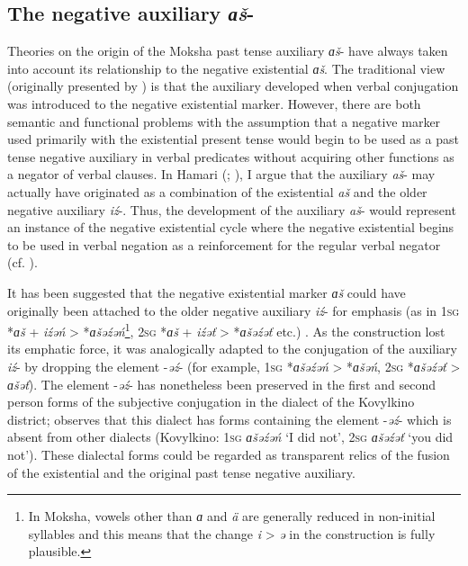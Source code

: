 \documentclass[output=paper]{langsci/langscibook}
\begin{document}
\subsection{The negative auxiliary \textit{ɑš}-}\label{sec:2:7.2}

Theories on the origin of the Moksha past tense auxiliary \textit{ɑš}- have always taken into account its relationship to the negative existential \textit{ɑš}. The traditional view (originally presented by \citealt[148]{Szinnyei1884}) is that the auxiliary developed when verbal conjugation was introduced to the negative existential marker. However, there are both semantic and functional problems with the assumption that a negative marker used primarily with the existential present tense would begin to be used as a past tense negative auxiliary in verbal predicates without acquiring other functions as a negator of verbal clauses. In Hamari (\citeyear[275]{Hamari2007}; \citeyear[480]{Hamari2013}), I argue that the auxiliary \textit{aš}- may actually have originated as a combination of the existential \textit{aš} and the older negative auxiliary \textit{iź}-. Thus, the development of the auxiliary \textit{aš}- would represent an instance of the negative existential cycle where the negative existential begins to be used in verbal negation as a reinforcement for the regular verbal negator (cf. \citealt[10--11]{Croft1991}).

It has been suggested that the negative existential marker \textit{ɑš}
could have originally been attached to the older negative auxiliary
\textit{iź}- for emphasis (as in \textsc{1sg} *\textit{ɑš} +
\textit{iźəń} > *\textit{ɑšəźəń}\footnote{In Moksha, vowels
other than \textit{ɑ} and \textit{ä} are generally reduced in non-initial
syllables and this means that the change \textit{i} > \textit{ə} in the
construction is fully plausible.}, \textsc{2sg} *\textit{ɑš} +
\textit{iźəť} > *\textit{ɑšəźəť} etc.) \parencites[273--275]{Hamari2007}[479--480]{Hamari2013}. As the construction lost its emphatic force, it was analogically adapted to the conjugation of the auxiliary \textit{iź}- by dropping the element -\textit{əź}- (for example, \textsc{1sg} *\textit{ɑšəźəń} > *\textit{ɑšəń}, \textsc{2sg} *\textit{ɑšəźəť} > \textit{ɑšəť}). The element -\textit{əź}- has nonetheless been preserved in the first and second person forms of the subjective conjugation in the dialect of the Kovylkino district; \citet[178]{Schemerova1972} observes that this dialect has forms containing the element -\textit{əź}- which is absent from other dialects (Kovylkino: 1\textsc{sg} \textit{ɑšəźəń} `I did not', 2\textsc{sg} \textit{ɑšəźəť} `you did not'). These dialectal forms could be regarded as transparent relics of the fusion of the existential and the original past tense negative auxiliary.
\end{document}
